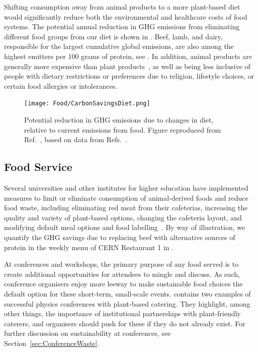 \documentclass[../SustainableHEP.tex]{subfiles}
\begin{document}
Shifting consumption away from animal products to a more plant-based diet would significantly reduce both the environmental and healthcare costs of food systems.  
The potential annual reduction in GHG emissions from eliminating different food groups from our diet is shown in .  
Beef, lamb, and dairy, responsible for the largest cumulative global emissions, are also among the highest emitters per 100 grams of protein, see .  In addition, animal products are generally more expensive than plant products~\cite{Springmann2021}, as well as being less inclusive of people with dietary restrictions or preferences due to religion, lifestyle choices, or certain food allergies or intolerances.

\begin{figure}[htb]
    \centering
    \texttt{[image: Food/CarbonSavingsDiet.png]}
    \caption[Annual carbon opportunity due to changes in diet.]{Potential reduction in GHG emissions due to changes in diet, relative to current emissions from food.  Figure reproduced from Ref.~\cite{OWID-CarbonOpportunity}, based on data from Refs.~\cite{PooreNemecek2018,Schmidinger}.
    \label{fig:foodchanges}}
\end{figure}


\subsection{Food Service}

Several universities and other institutes for higher education have implemented measures to limit or eliminate consumption of animal-derived foods and reduce food waste, including eliminating red meat from their cafeterias, increasing the quality and variety of plant-based options, changing the cafeteria layout, and modifying default meal options and food labelling~\cite{Berlin, EPFL, Cambridge, Goldsmiths}.    By way of illustration, we quantify the GHG savings due to replacing beef with alternative sources of protein in the weekly menu of CERN Restaurant 1 in .

At conferences and workshops, the primary purpose of any food served is to create additional opportunities for attendees to mingle and discuss.  As such, conference organisers enjoy more leeway to make sustainable food choices the default option for these short-term, small-scale events.   contains two examples of successful physics conferences with plant-based catering. They highlight, among other things, the importance of institutional partnerships with plant-friendly caterers, and organisers should push for these if they do not already exist.  For further discussion on sustainability at conferences, see Section~\ref{sec:ConferenceWaste}.
\end{document}
